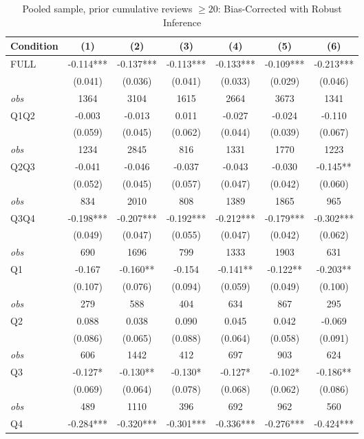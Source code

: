 \begin{table}[!htbp]
\centering
\caption{Pooled sample, prior cumulative reviews $\geq20$: Bias-Corrected with Robust Inference}
\begin{tabular}{lcccccc}
\toprule
Condition & (1) & (2) & (3) & (4) & (5) & (6) \\
\midrule
FULL & -0.114*** & -0.137*** & -0.113*** & -0.133*** & -0.109*** & -0.213*** \\
 & (0.041) & (0.036) & (0.041) & (0.033) & (0.029) & (0.046) \\
\textit{obs} & 1364 & 3104 & 1615 & 2664 & 3673 & 1341 \\
Q1Q2 & -0.003 & -0.013 & 0.011 & -0.027 & -0.024 & -0.110 \\
 & (0.059) & (0.045) & (0.062) & (0.044) & (0.039) & (0.067) \\
\textit{obs} & 1234 & 2845 & 816 & 1331 & 1770 & 1223 \\
Q2Q3 & -0.041 & -0.046 & -0.037 & -0.043 & -0.030 & -0.145** \\
 & (0.052) & (0.045) & (0.057) & (0.047) & (0.042) & (0.060) \\
\textit{obs} & 834 & 2010 & 808 & 1389 & 1865 & 965 \\
Q3Q4 & -0.198*** & -0.207*** & -0.192*** & -0.212*** & -0.179*** & -0.302*** \\
 & (0.049) & (0.047) & (0.055) & (0.047) & (0.042) & (0.062) \\
\textit{obs} & 690 & 1696 & 799 & 1333 & 1903 & 631 \\
Q1 & -0.167 & -0.160** & -0.154 & -0.141** & -0.122** & -0.203** \\
 & (0.107) & (0.076) & (0.094) & (0.059) & (0.049) & (0.100) \\
\textit{obs} & 279 & 588 & 404 & 634 & 867 & 295 \\
Q2 & 0.088 & 0.038 & 0.090 & 0.045 & 0.042 & -0.069 \\
 & (0.086) & (0.065) & (0.088) & (0.064) & (0.058) & (0.091) \\
\textit{obs} & 606 & 1442 & 412 & 697 & 903 & 624 \\
Q3 & -0.127* & -0.130** & -0.130* & -0.127* & -0.102* & -0.186** \\
 & (0.069) & (0.064) & (0.078) & (0.068) & (0.062) & (0.086) \\
\textit{obs} & 489 & 1110 & 396 & 692 & 962 & 560 \\
Q4 & -0.284*** & -0.320*** & -0.301*** & -0.336*** & -0.276*** & -0.424*** \\

\end{tabular}
\end{table}
